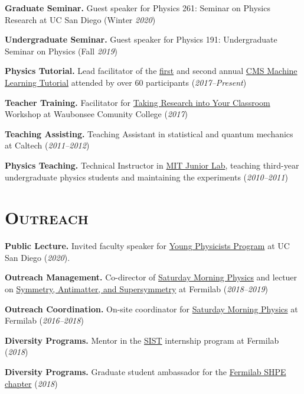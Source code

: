 \documentclass[11pt]{res}
\newcommand{\MarginText}[1]{\section{\textsc{#1}}\vspace{10pt}}
\begin{document}
\begin{resume}
\textbf{Graduate Seminar.} Guest speaker for Physics 261:
Seminar on Physics Research at UC San Diego (Winter \textit{2020})

\textbf{Undergraduate Seminar.} Guest speaker for Physics 191:
Undergraduate Seminar on Physics (Fall \textit{2019})

\textbf{Physics Tutorial.} Lead facilitator of the
\href{https://indico.cern.ch/event/628146/}{first} and second annual \href{https://indico.cern.ch/event/726984/}{CMS Machine Learning
    Tutorial} attended by over 60 participants (\textit{2017--Present})

\textbf{Teacher Training.} Facilitator for
  \href{http://eddata.fnal.gov/lasso/program_search/show_workshopID_new.lasso?event_id=435}{Taking  Research into Your Classroom} Workshop at Waubonsee Comunity College (\textit{2017})

\textbf{Teaching Assisting.} Teaching Assistant in statistical and quantum mechanics at Caltech (\textit{2011--2012})

\textbf{Physics Teaching.} Technical Instructor in \href{http://web.mit.edu/8.13/www/index.shtml}{MIT Junior Lab}, teaching third-year
  undergraduate physics students and maintaining the experiments (\textit{2010--2011})



  \MarginText{Outreach}

\textbf{Public Lecture.} Invited faculty speaker for \href{http://ypp.ucsd.edu/}{Young Physicists Program} at UC
San Diego (\textit{2020}).

\textbf{Outreach Management.} Co-director of \href{http://saturdaymorningphysics.fnal.gov/}{Saturday
  Morning Physics} and lectuer on \href{http://saturdaymorningphysics.fnal.gov/fall-session-2018/}{Symmetry, Antimatter, and Supersymmetry} at Fermilab (\textit{2018--2019})

\textbf{Outreach Coordination.} On-site coordinator for \href{http://saturdaymorningphysics.fnal.gov/}{Saturday Morning Physics} at Fermilab (\textit{2016--2018})

\textbf{Diversity Programs.} Mentor in the \href{http://diversity.fnal.gov/sist/}{SIST} internship program at Fermilab (\textit{2018})

\textbf{Diversity Programs.} Graduate student ambassador for the \href{http://diversity.fnal.gov/fshpe/}{Fermilab SHPE chapter} (\textit{2018})


\end{resume}
\end{document}
